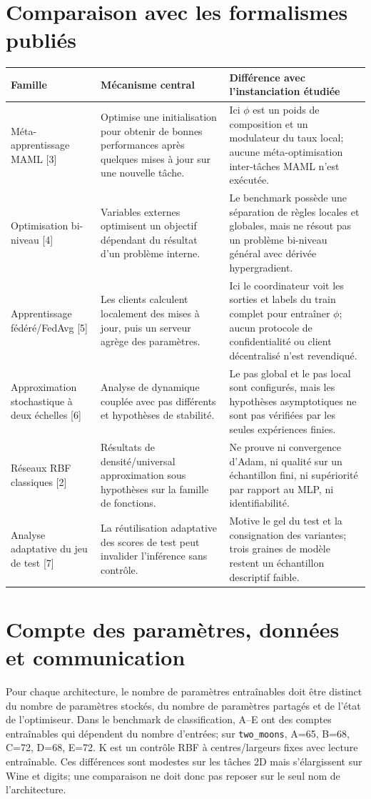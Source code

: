 \documentclass[11pt,a4paper]{article}
\begin{document}
\section{Comparaison avec les formalismes publiés}
\begin{longtable}{p{}p{}p{}}
\toprule
\textbf{Famille} & \textbf{Mécanisme central} & \textbf{Différence avec l'instanciation étudiée}\\
\midrule
\endhead
Méta-apprentissage MAML [3] & Optimise une initialisation pour obtenir de bonnes performances après quelques mises à jour sur une nouvelle tâche. & Ici $\phi$ est un poids de composition et un modulateur du taux local; aucune méta-optimisation inter-tâches MAML n'est exécutée.\\
Optimisation bi-niveau [4] & Variables externes optimisent un objectif dépendant du résultat d'un problème interne. & Le benchmark possède une séparation de règles locales et globales, mais ne résout pas un problème bi-niveau général avec dérivée hypergradient.\\
Apprentissage fédéré/FedAvg [5] & Les clients calculent localement des mises à jour, puis un serveur agrège des paramètres. & Ici le coordinateur voit les sorties et labels du train complet pour entraîner $\phi$; aucun protocole de confidentialité ou client décentralisé n'est revendiqué.\\
Approximation stochastique à deux échelles [6] & Analyse de dynamique couplée avec pas différents et hypothèses de stabilité. & Le pas global et le pas local sont configurés, mais les hypothèses asymptotiques ne sont pas vérifiées par les seules expériences finies.\\
Réseaux RBF classiques [2] & Résultats de densité/universal approximation sous hypothèses sur la famille de fonctions. & Ne prouve ni convergence d'Adam, ni qualité sur un échantillon fini, ni supériorité par rapport au MLP, ni identifiabilité.\\
Analyse adaptative du jeu de test [7] & La réutilisation adaptative des scores de test peut invalider l'inférence sans contrôle. & Motive le gel du test et la consignation des variantes; trois graines de modèle restent un échantillon descriptif faible.\\
\bottomrule
\end{longtable}

\section{Compte des paramètres, données et communication}
Pour chaque architecture, le nombre de paramètres entraînables doit être distinct du nombre de paramètres stockés, du nombre de paramètres partagés et de l'état de l'optimiseur. Dans le benchmark de classification, A--E ont des comptes entraînables qui dépendent du nombre d'entrées; sur \texttt{two\_moons}, A=65, B=68, C=72, D=68, E=72. K est un contrôle RBF à centres/largeurs fixes avec lecture entraînable. Ces différences sont modestes sur les tâches 2D mais s'élargissent sur Wine et digits; une comparaison ne doit donc pas reposer sur le seul nom de l'architecture.
\end{document}
